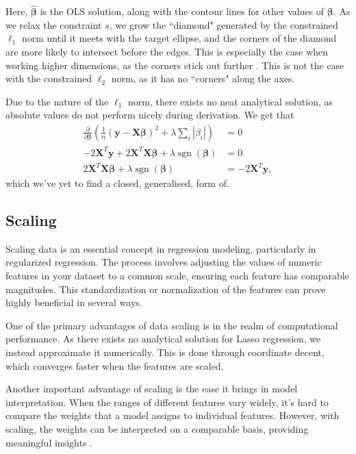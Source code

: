 \documentclass{article}
\DeclareMathOperator*{\sgn}{sgn}
\begin{document}
Here, $\boldsymbol{\hat{\beta}}$ is the OLS solution, along with the contour lines for other values of $\boldsymbol{\beta}$. As we relax the constraint $s$, we grow the ``diamond" generated by the constrained $\ell_1$ norm until it meets with the target ellipse, and the corners of the diamond are more likely to intersect before the edges. This is especially the case when working higher dimensions, as the corners stick out further \cite[p.~432--436]{Murphy2012}. This is not the case with the constrained $\ell_2$ norm, as it has no ``corners" along the axes.

Due to the nature of the $\ell_1$ norm, there exists no neat analytical solution, as absolute values do not perform nicely during derivation. We get that
\begin{align*}
    \frac{\partial}{\partial \boldsymbol{\beta}} \left( \frac{1}{n} \left( \boldsymbol{y} - \boldsymbol{X\beta} \right)^2 + \lambda \sum_i |\beta_i| \right) &= 0 \\
    -2 \boldsymbol{X}^T \boldsymbol{y} + 2 \boldsymbol{X}^T \boldsymbol{X\beta} + \lambda \sgn(\boldsymbol{\beta}) &= 0 \\
    2 \boldsymbol{X}^T \boldsymbol{X\beta} + \lambda \sgn(\boldsymbol{\beta}) &= -2 \boldsymbol{X}^T \boldsymbol{y},
\end{align*}
which we've yet to find a closed, generalised, form of.

\subsection{Scaling}
Scaling data is an essential concept in regression modeling, particularly in regularized regression. The process involves adjusting the values of numeric features in your dataset to a common scale, ensuring each feature has comparable magnitudes.
This standardization or normalization of the features can prove highly beneficial in several ways.

One of the primary advantages of data scaling is in the realm of computational performance. As there exists no analytical solution for Lasso regression, we instead approximate it numerically. This is done through coordinate decent, which converges faster when the features are scaled.

Another important advantage of scaling is the ease it brings in model interpretation. When the ranges of different features vary widely, it's hard to compare the weights that a model assigns to individual features. However, with scaling, the weights can be interpreted on a comparable basis, providing meaningful insights \cite[p.~237]{james2021introduction}.
\end{document}
